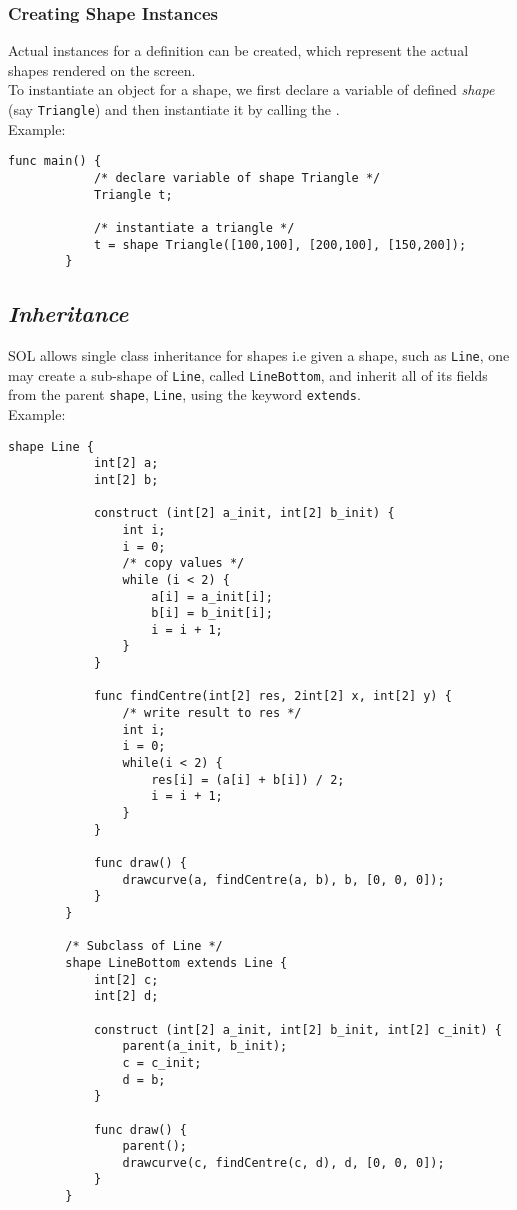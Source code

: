     \subsubsection{Creating Shape Instances}
    Actual instances for a  definition can be created, which represent the actual shapes rendered on the screen.\\
    To instantiate an object for a shape, we first declare a variable of defined \textit{shape} (say \texttt{Triangle}) and then instantiate it by calling the .\\
    Example:\\
    \begin{lstlisting}[style=sol]
        func main() {
            /* declare variable of shape Triangle */
            Triangle t; 

            /* instantiate a triangle */
            t = shape Triangle([100,100], [200,100], [150,200]); 
        }
    \end{lstlisting}

    \subsection{\textit{Inheritance}}
    SOL allows single class inheritance for shapes i.e given a shape, such as \texttt{Line}, one may create a sub-shape of \texttt{Line}, called \texttt{LineBottom}, and inherit all of its fields from the parent \texttt{shape}, \texttt{Line}, using the keyword \texttt{extends}.\\
    Example:\\
    \begin{lstlisting}[style=sol]
        shape Line {
            int[2] a;
            int[2] b;
            
            construct (int[2] a_init, int[2] b_init) {
                int i;
                i = 0;
                /* copy values */
                while (i < 2) {
                    a[i] = a_init[i];
                    b[i] = b_init[i];
                    i = i + 1;
                }
            }

            func findCentre(int[2] res, 2int[2] x, int[2] y) {
                /* write result to res */
                int i;
                i = 0;
                while(i < 2) {
                    res[i] = (a[i] + b[i]) / 2;
                    i = i + 1;
                }
            }
            
            func draw() {
                drawcurve(a, findCentre(a, b), b, [0, 0, 0]);
            }
        }

        /* Subclass of Line */
        shape LineBottom extends Line {
            int[2] c;
            int[2] d;

            construct (int[2] a_init, int[2] b_init, int[2] c_init) {
                parent(a_init, b_init);
                c = c_init;
                d = b;
            }

            func draw() {
                parent();
                drawcurve(c, findCentre(c, d), d, [0, 0, 0]);
            }
        }
    \end{lstlisting}

